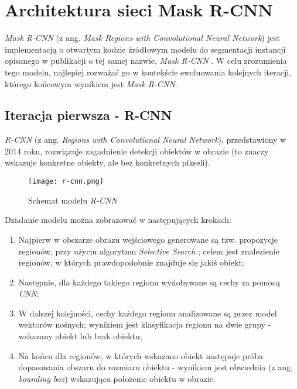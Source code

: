 \section{Architektura sieci Mask R-CNN}
\label{sec:architekrura_mask_rcnn}

\textit{Mask R-CNN} \cite{matterport-mask-rcnn} (z ang. \textit{Mask Regions with Convolutional Neural Network}) jest implementacją o otwartym kodzie źródłowym modelu do segmentacji instancji opisanego w publikacji o tej samej nazwie, \textit{Mask R-CNN} \cite{general-mask-rcnn}.
W celu zrozumienia tego modelu, najlepiej rozważać go w kontekście ewoluowania kolejnych iteracji, którego końcowym wynikiem jest \textit{Mask R-CNN}.

\subsection{Iteracja pierwsza - R-CNN}

\textit{R-CNN} \cite{rcnn} (z ang. \textit{Regions with Convolutional Neural Network}), przedstawiony w 2014 roku, rozwiązuje zagadnienie detekcji obiektów w obrazie (to znaczy wskazuje konkretne obiekty, ale bez konkretnych pikseli).

\begin{figure}[h]
  \centering
  \caption{Schemat modelu \textit{R-CNN}}
  \texttt{[image: r-cnn.png]}
  \label{fig:r_cnn}
\end{figure}

Działanie modelu można zobrazować w następujących krokach:
\label{sec:regiony}
\begin{enumerate}
  \item Najpierw w obszarze obrazu wejściowego generowane są tzw. propozycje regionów, przy użyciu algorytmu \textit{Selective Search} \cite{selective-search}; celem jest znalezienie regionów, w których prawdopodobnie znajduje się jakiś obiekt;
	\item Następnie, dla każdego takiego regionu wydobywane są cechy za pomocą \textit{CNN};
  \item W dalszej kolejności, cechy każdego regionu analizowane są przez model wektorów nośnych; wynikiem jest klasyfikacja regionu na dwie grupy - wskazany obiekt lub brak obiektu;
	\item Na końcu dla regionów, w których wskazano obiekt następuje próba dopasowania obszaru do rozmiaru obiektu - wynikiem jest obwiednia (z ang. \textit{bounding box}) wskazująca położenie obiektu w obrazie.
\end{enumerate}

